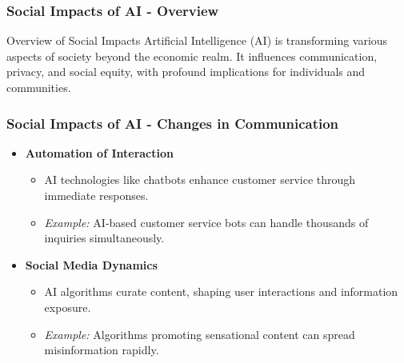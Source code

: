 \documentclass[aspectratio=169]{beamer}
\begin{document}
\begin{frame}[fragile]
    \frametitle{Social Impacts of AI - Overview}
    \begin{block}{Overview of Social Impacts}
        Artificial Intelligence (AI) is transforming various aspects of society beyond the economic realm. It influences communication, privacy, and social equity, with profound implications for individuals and communities.
    \end{block}
\end{frame}

\begin{frame}[fragile]
    \frametitle{Social Impacts of AI - Changes in Communication}
    \begin{itemize}
        \item \textbf{Automation of Interaction}
        \begin{itemize}
            \item AI technologies like chatbots enhance customer service through immediate responses.
            \item \textit{Example:} AI-based customer service bots can handle thousands of inquiries simultaneously.
        \end{itemize}
        \item \textbf{Social Media Dynamics}
        \begin{itemize}
            \item AI algorithms curate content, shaping user interactions and information exposure.
            \item \textit{Example:} Algorithms promoting sensational content can spread misinformation rapidly.
        \end{itemize}
    \end{itemize}
\end{frame}
\end{document}
